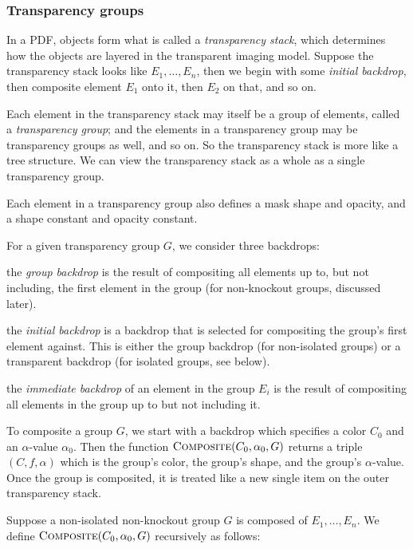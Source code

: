 \subsubsection{Transparency groups}

In a PDF, objects form what is called a {\it transparency stack}, which determines how the objects are
layered in the transparent imaging model.
Suppose the transparency stack looks like $E_1,\dots,E_n$, then we begin with some {\it initial backdrop},
then composite element $E_1$ onto it, then $E_2$ on that, and so on.

Each element in the transparency stack may itself be a group of elements, called a {\it transparency group};
and the elements in a transparency group may be transparency groups as well, and so on.
So the transparency stack is more like a tree structure.
We can view the transparency stack as a whole as a single transparency group.

Each element in a transparency group also defines a mask shape and opacity, and a shape constant and
opacity constant.

For a given transparency group $G$, we consider three backdrops:
\benum
    \item the {\it group backdrop} is the result of compositing all elements up to, but not including, the
    first element in the group (for non-knockout groups, discussed later).
    \item the {\it initial backdrop} is a backdrop that is selected for compositing the group's first element
    against.
    This is either the group backdrop (for non-isolated groups) or a transparent backdrop (for isolated groups,
    see below).
    \item the {\it immediate backdrop} of an element in the group $E_i$ is the result of compositing all
    elements in the group up to but not including it.
\eenum

To composite a group $G$, we start with a backdrop which specifies a color $C_0$ and an $\alpha$-value
$\alpha_0$.
Then the function $\hbox{\sc Composite}(C_0,\alpha_0,G)$ returns a triple $(C,f,\alpha)$ which is the group's color,
the group's shape, and the group's $\alpha$-value.
Once the group is composited, it is treated like a new single item on the outer transparency stack.

Suppose a non-isolated non-knockout group $G$ is composed of $E_1,\dots,E_n$.
We define $\hbox{\sc Composite}(C_0,\alpha_0,G)$ recursively as follows:

